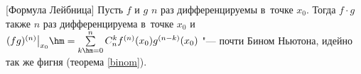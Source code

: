 [Формула Лейбница]\label{Lay}
    Пусть $f$ и $g$ $n$ раз дифференцируемы в~точке $x_0$. Тогда $f\cdot g$ также $n$ раз дифференцируема в~точке $x_0$ и $(fg)^{(n)}\big|_{x_0}\hm=
    \sum\limits_{k\hm=0}^nC_n^kf^{(n)}(x_0)g^{(n-k)}(x_0)$ "--- почти Бином Ньютона, идейно так же фигня (теорема \ref{binom}).
